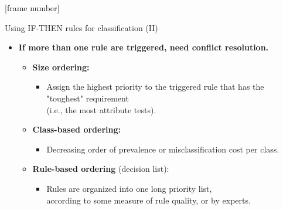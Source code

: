 \documentclass[aspectratio=169,t,table]{beamer}
\begin{document}
  {
    [frame number]
    \begin{frame}{Using \uppercase{if-then} rules for classification (II)}
      \begin{itemize}
        \item \textbf{If more than one rule are triggered, need {\color{airforceblue}conflict resolution}.}
        \begin{itemize}
          \item \textbf{\color{airforceblue}Size ordering:}
          \begin{itemize}
            \item Assign the highest priority to the triggered rule that has the "toughest" requirement \\ (i.e., the most attribute tests).
          \end{itemize}
          \item \textbf{\color{airforceblue}Class-based ordering:}
          \begin{itemize}
            \item Decreasing order of prevalence or misclassification cost per class.
          \end{itemize}
        \item \textbf{\color{airforceblue}Rule-based ordering} (decision list):
        \begin{itemize}
          \item Rules are organized into one long priority list,\\
          according to some measure of rule quality, or by experts.
        \end{itemize}
      \end{itemize}
      \end{itemize}
    \end{frame}
  }
\end{document}
